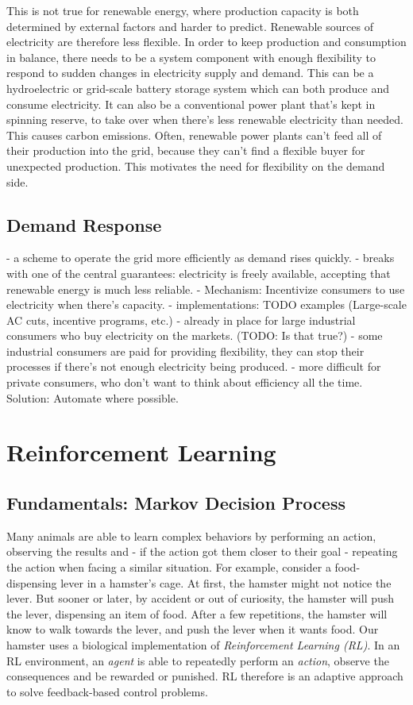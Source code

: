 This is not true for renewable energy, where production capacity is both determined by external factors and harder to predict.
Renewable sources of electricity are therefore less flexible.
In order to keep production and consumption in balance, there needs to be a system component with enough flexibility to respond to sudden changes in electricity supply and demand.
This can be a hydroelectric or grid-scale battery storage system which can both produce and consume electricity.
It can also be a conventional power plant that's kept in spinning reserve, to take over when there's less renewable electricity than needed. This causes carbon emissions.
Often, renewable power plants can't feed all of their production into the grid, because they can't find a flexible buyer for unexpected production.
This motivates the need for flexibility on the demand side.



\subsection{Demand Response}
- a scheme to operate the grid more efficiently as demand rises quickly.
- breaks with one of the central guarantees: electricity is freely available, accepting that renewable energy is much less reliable.
- Mechanism: Incentivize consumers to use electricity when there's capacity.
- implementations: TODO examples (Large-scale AC cuts, incentive programs, etc.)
- already in place for large industrial consumers who buy electricity on the markets. (TODO: Is that true?)
    - some industrial consumers are paid for providing flexibility, they can stop their processes if there's not enough electricity being produced.
- more difficult for private consumers, who don't want to think about efficiency all the time. Solution: Automate where possible.


\section{Reinforcement Learning}

\subsection{Fundamentals: Markov Decision Process}
Many animals are able to learn complex behaviors by performing an action, observing the results and - if the action got them closer to their goal - repeating the action when facing a similar situation.
For example, consider a food-dispensing lever in a hamster's cage. At first, the hamster might not notice the lever. But sooner or later, by accident or out of curiosity, the hamster will push the lever, dispensing an item of food. After a few repetitions, the hamster will know to walk towards the lever, and push the lever when it wants food.
Our hamster uses a biological implementation of \textit{Reinforcement Learning (RL)}.
In an RL environment, an \textit{agent} is able to repeatedly perform an \textit{action}, observe the consequences and be rewarded or punished.
RL therefore is an adaptive approach to solve feedback-based control problems.

